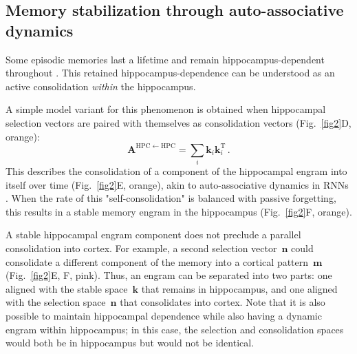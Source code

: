 \subsection{Memory stabilization through auto-associative dynamics}

Some episodic memories last a lifetime and remain hippocampus-dependent throughout \citep{Winocur2011}. This retained hippocampus-dependence can be understood as an active consolidation \emph{within} the hippocampus. %

A simple model variant for this phenomenon is obtained when hippocampal selection vectors are paired with themselves as consolidation vectors (Fig.~\ref{fig2}D, orange):
\begin{equation}
  \mathbf{A}^{\mathrm{HPC}\leftarrow\mathrm{HPC}} = \sum_i \mathbf{k}_i{\mathbf{k}}_i^\text{T}\,.
\end{equation}
%
This describes the consolidation of a component of the hippocampal engram into itself over time (Fig.~\ref{fig2}E, orange), akin to auto-associative dynamics in RNNs \citep{Hopfield1982}. When the rate of this "self-consolidation" is balanced with passive forgetting, this results in a stable memory engram in the hippocampus (Fig.~\ref{fig2}F, orange). 

A stable hippocampal engram component does not preclude a parallel consolidation into cortex. For example, a second selection vector~$\mathbf{n}$ could consolidate a different component of the memory into a cortical pattern~$\mathbf{m}$ (Fig.~\ref{fig2}E, F, pink). Thus, an engram can be separated into two parts: one aligned with the stable space~$\mathbf{k}$ that remains in hippocampus, and one aligned with the selection space~$\mathbf{n}$ that consolidates into cortex. Note that it is also possible to maintain hippocampal dependence while also having a dynamic engram within hippocampus; in this case, the selection and consolidation spaces would both be in hippocampus but would not be identical.

